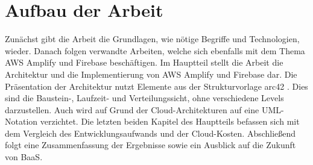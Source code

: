 \section{Aufbau der Arbeit}

Zunächst gibt die Arbeit die Grundlagen, wie nötige Begriffe und Technologien, wieder. Danach folgen verwandte Arbeiten, welche sich ebenfalls mit dem Thema \ac{AWS} Amplify und Firebase beschäftigen. Im Hauptteil stellt die Arbeit die Architektur und die Implementierung von \ac{AWS} Amplify und Firebase dar. Die Präsentation der Architektur nutzt Elemente aus der Strukturvorlage arc42 \autocite{starke2007strukturvorlage}. Dies sind die Baustein-, Laufzeit- und Verteilungssicht, ohne verschiedene Levels darzustellen. Auch wird auf Grund der Cloud-Architekturen auf eine UML-Notation verzichtet. Die letzten beiden Kapitel des Hauptteils befassen sich mit dem Vergleich des Entwicklungsaufwands und der Cloud-Kosten. Abschließend folgt eine Zusammenfassung der Ergebnisse sowie ein Ausblick auf die Zukunft von \ac{BaaS}.